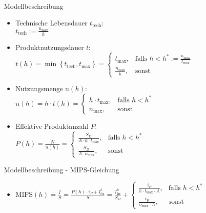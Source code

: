 \documentclass[beamer, xcolor=table]{beamer}
\begin{document}
	\begin{frame}{Modellbeschreibung}
		\begin{itemize}
			\item Technische Lebensdauer $t_\text{tech}$: \\ $t_\text{tech} := \frac{n_{\text{max}}}{h}$
			\pause
			\item Produktnutzungsdauer $t$: \\[5pt] $t(h) = \min \left\{t_\text{tech}, t_{\text{max}} \right\} = \left\{\begin{array}{cl}  t_{\text{max}}, & \mbox{falls } h < h^* := \frac{n_{\text{max}}}{t_{\text{max}}} \\ \frac{n_{\text{max}}}{h}, & \mbox{sonst} \end{array}\right.$
			\pause
			\item Nutzungsmenge $n(h)$: \\[5pt] $n (h) = h \cdot t(h) = \left\{\begin{array}{cl}  h \cdot t_{\text{max}}, & \mbox{falls } h < h^* \\ n_{\text{max}}, & \mbox{sonst} \end{array}\right.$
			\pause
			\item Effektive Produktanzahl $P$: \\[5pt] $P (h) = \frac{N}{n(h)} = \left\{\begin{array}{cl}  \frac{S_D}{A \cdot h \cdot t_{\text{max}}}, & \mbox{falls } h < h^* \\[5pt] \frac{S_D}{A \cdot n_{\text{max}}}, & \mbox{sonst} \end{array}\right.$
		\end{itemize}
	\end{frame}

	\begin{frame}{Modellbeschreibung - MIPS-Gleichung}
		\begin{itemize}
			\item $\text{MIPS}(h) = \frac{I}{S} = \frac{P(h) \cdot i_P + I_{\text{fix}}^h}{S} =
			\frac{I_{\text{fix}}^h}{S_D} + \left\{ \begin{array}{cl}  \frac{i_P}{h \cdot t_{\text{max}} \cdot A}, & \mbox{falls } h < h^* \\[5pt] \frac{i_P}{n_{\text{max}} \cdot A}, & \mbox{sonst} \end{array}\right.$
		\end{itemize}
		\pause
		\begin{center}
			\resizebox{0.7\linewidth}{!}{
				
			}
		\end{center}
	\end{frame}
\end{document}
